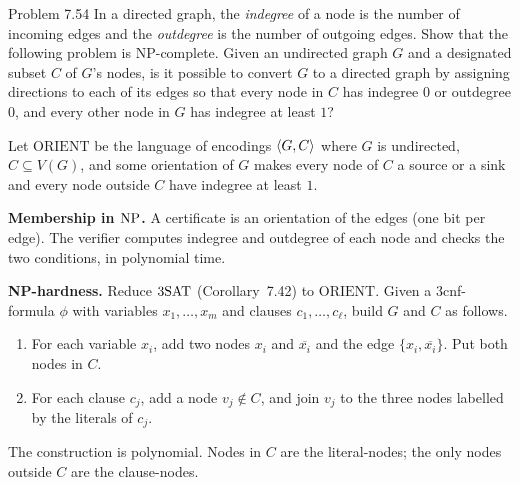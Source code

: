 \begin{question}{Problem 7.54}
In a directed graph, the \emph{indegree} of a node is the number of incoming edges and the \emph{outdegree} is the number of outgoing edges. Show that the following problem is NP-complete. Given an undirected graph $G$ and a designated subset $C$ of $G$'s nodes, is it possible to convert $G$ to a directed graph by assigning directions to each of its edges so that every node in $C$ has indegree $0$ or outdegree $0$, and every other node in $G$ has indegree at least $1$?
\end{question}
\begin{soln}
Let $\mathrm{ORIENT}$ be the language of encodings $\langle G,C\rangle$ where $G$ is undirected, $C\subseteq V(G)$, and some orientation of $G$ makes every node of $C$ a source or a sink and every node outside $C$ have indegree at least $1$.

\textbf{Membership in $\mathrm{NP}$.}
A certificate is an orientation of the edges (one bit per edge). The verifier computes indegree and outdegree of each node and checks the two conditions, in polynomial time.

\textbf{NP-hardness.}
Reduce $\mathrm{3SAT}$ (Corollary~7.42) to $\mathrm{ORIENT}$. Given a 3cnf-formula $\phi$ with variables $x_1,\ldots,x_m$ and clauses $c_1,\ldots,c_\ell$, build $G$ and $C$ as follows.
\begin{enumerate}
\item For each variable $x_i$, add two nodes $x_i$ and $\overline{x_i}$ and the edge $\{x_i,\overline{x_i}\}$. Put both nodes in $C$.
\item For each clause $c_j$, add a node $v_j\notin C$, and join $v_j$ to the three nodes labelled by the literals of $c_j$.
\end{enumerate}
The construction is polynomial. Nodes in $C$ are the literal-nodes; the only nodes outside $C$ are the clause-nodes.

\begin{center}
\end{center}


\end{soln}
